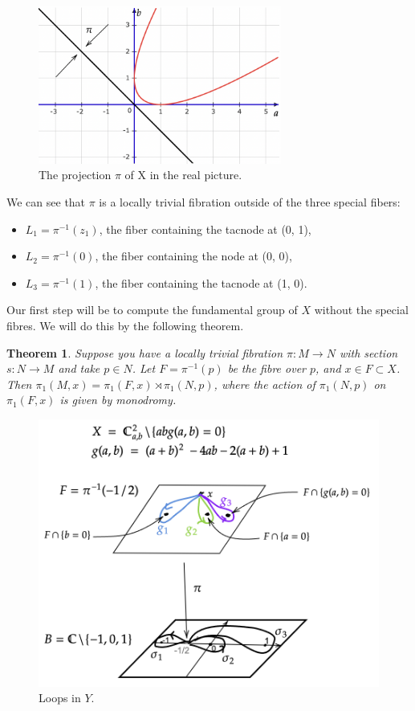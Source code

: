 \documentclass[oneside,reqno]{amsart}
\newtheorem{thm}{Theorem}[section]
\theoremstyle{definition}
\theoremstyle{definition}
\theoremstyle{definition}
\theoremstyle{definition}
\begin{document}
\begin{figure}[!h]
    \centering
    \includegraphics[width=8cm]{rank2exmp/projection1.png}
    \caption{The projection $\pi$ of X in the real picture.}
    \label{projection1}
\end{figure}
We can see that $\pi$ is a locally trivial fibration outside of the three special fibers:
\begin{itemize}
    \item $L_1 = \pi^{-1}(z_1)$, the fiber containing the tacnode at (0, 1), \\
    \item $L_2 = \pi^{-1}(0)$, the fiber containing the node at (0, 0), \\
    \item $L_3= \pi^{-1}(1)$, the fiber containing the tacnode at (1, 0).
\end{itemize}
Our first step will be to compute the fundamental group of $X$ without the special fibres. We will do this by the following theorem.
\begin{thm}\cite[Theorem 2.1]{cogolludo}
\label{locallytriv}
Suppose you have a locally trivial fibration $\pi : M \to N$ with section $s : N\to M$ and take $p \in N $. Let $F = \pi^{-1}(p)$ be the fibre over $p$, and $x\in F\subset X$. Then $\pi_1(M,x) = \pi_1(F,x) \rtimes \pi_1(N,p)$, where the action of $\pi_1(N,p)$ on $\pi_1(F,x)$ is given by monodromy. 
\end{thm}
\begin{figure}[!h]
    \centering
    \includegraphics[width=12cm]{rank2exmp/zariski1.png}
    \caption{Loops in $Y$.}
    \label{zariski1}
\end{figure}
\end{document}
